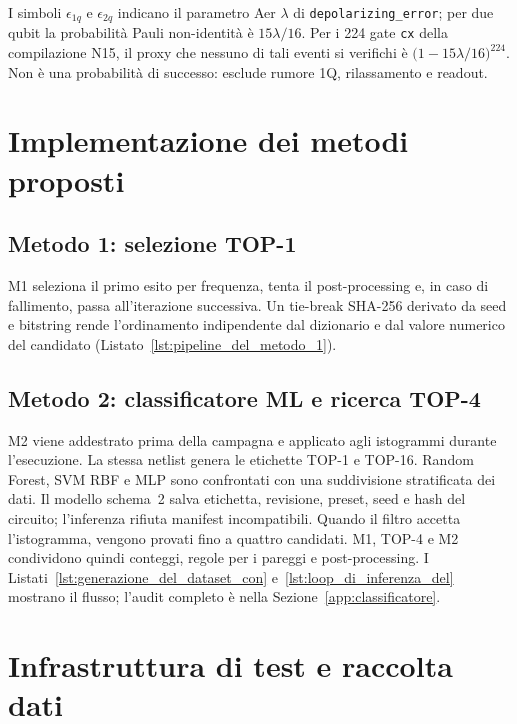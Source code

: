 \begin{onehalfspace}
I simboli $\epsilon_{1q}$ e $\epsilon_{2q}$ indicano il parametro Aer $\lambda$ di
\texttt{depolarizing\_error}; per due qubit la probabilità Pauli non-identità è
$15\lambda/16$. Per i 224 gate \texttt{cx} della compilazione N15, il proxy che nessuno
di tali eventi si verifichi è ${\bigl(1-15\lambda/16\bigr)}^{224}$. Non è una probabilità di
successo: esclude rumore 1Q, rilassamento e readout.

\section{Implementazione dei metodi proposti}
\label{sec:impl_metodi}

\subsection{Metodo 1: selezione TOP-1}
\label{sec:impl_metodo1}

M1 seleziona il primo esito per frequenza, tenta il post-processing e, in caso di
fallimento, passa all'iterazione successiva. Un tie-break SHA-256 derivato da seed e
bitstring rende l'ordinamento indipendente dal dizionario e dal valore numerico del
candidato (Listato~\ref{lst:pipeline_del_metodo_1}).

\subsection{Metodo 2: classificatore ML e ricerca TOP-4}
\label{sec:impl_metodo2}

M2 viene addestrato prima della campagna e applicato agli istogrammi durante l'esecuzione. La stessa netlist genera le etichette TOP-1 e TOP-16. Random Forest, \ac{SVM} RBF e \ac{MLP} sono confrontati con una suddivisione stratificata dei dati. Il modello schema~2 salva etichetta, revisione, preset, seed e hash del circuito; l'inferenza rifiuta manifest incompatibili. Quando il filtro accetta l'istogramma, vengono provati fino a quattro candidati. M1, TOP-4 e M2 condividono quindi conteggi, regole per i pareggi e post-processing. I Listati~\ref{lst:generazione_del_dataset_con} e~\ref{lst:loop_di_inferenza_del} mostrano il flusso; l'audit completo è nella Sezione~\ref{app:classificatore}.

\section{Infrastruttura di test e raccolta dati}
\label{sec:infrastruttura}


\end{onehalfspace}
